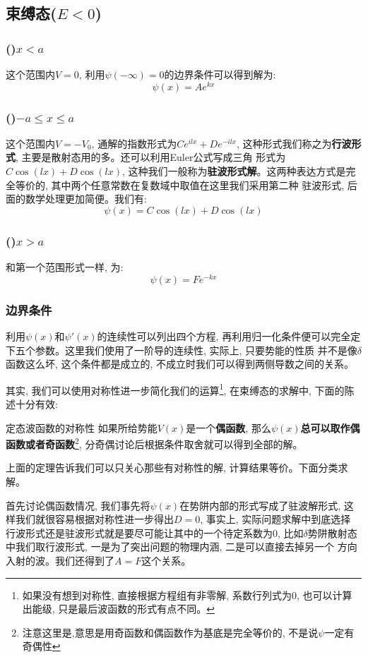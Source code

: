 \documentclass[a4paper,zihao=-4,linespread=1]{ctexrep}
\begin{document}
    \subsection*{束缚态($E<0$)}
    \subsubsection*{()$x<a$}
    这个范围内$V=0$, 利用$\psi(-\infty)=0$的边界条件可以得到解为:$$\psi(x)=Ae^{kx}$$
    \subsubsection*{()$-a\leq x\leq a$}
    这个范围内$V=-V_0$, 通解的指数形式为$Ce^{ilx}+De^{-ilx}$, 这种形式我们称之为\textbf{行波形式}, 主要是散射态用的多。还可以利用Euler公式写成三角
    形式为$C\cos (lx)+D\cos (lx)$, 这种我们一般称为\textbf{驻波形式解}。这两种表达方式是完全等价的, 其中两个任意常数在复数域中取值在这里我们采用第二种
    驻波形式, 后面的数学处理更加简便。我们有:$$\psi(x)=C\cos (lx)+D\cos (lx)$$
    \subsubsection*{()$x>a$}
    和第一个范围形式一样, 为:$$\psi(x)=Fe^{-kx}$$
    \subsubsection*{边界条件}
    利用$\psi(x)$和$\psi\prime(x)$的连续性可以列出四个方程, 再利用归一化条件便可以完全定下五个参数。这里我们使用了一阶导的连续性, 实际上, 只要势能的性质
    并不是像$\delta$函数这么坏, 这个条件都是成立的, 不成立时我们可以得到两侧导数之间的关系。

    其实, 我们可以使用对称性进一步简化我们的运算\footnote[1]{如果没有想到对称性, 直接根据方程组有非零解, 系数行列式为0, 也可以计算出能级, 只是最后波函数的形式有点不同。}, 在束缚态的求解中, 下面的陈述十分有效:
    \begin{proposition}{定态波函数的对称性}
        如果所给势能$V(x)$是一个\textbf{偶函数}, 那么$\psi(x)$\textbf{总可以取作偶函数或者奇函数}\footnote[1]{注意这里是,意思是用奇函数和偶函数作为基底是完全等价的, 不是说$\psi$一定有奇偶性}, 分奇偶讨论后根据条件取舍就可以得到全部的解。
    \end{proposition}
    上面的定理告诉我们可以只关心那些有对称性的解, 计算结果等价。下面分类求解。
    
    首先讨论偶函数情况, 我们事先将$\psi(x)$在势阱内部的形式写成了驻波解形式, 这样我们就很容易根据对称性进一步得出$D=0$, 事实上, 实际问题求解中到底选择
    行波形式还是驻波形式就是要尽可能让其中的一个待定系数为$0$, 比如$\delta$势阱散射态中我们取行波形式, 一是为了突出问题的物理内涵, 二是可以直接去掉另一个
    方向入射的波。我们还得到了$A=F$这个关系。
\end{document}
